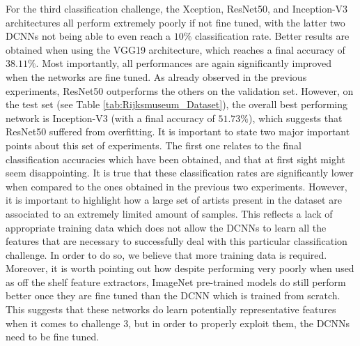 \documentclass[runningheads]{llncs}
\begin{document}
For the third classification challenge, the Xception, ResNet50, and Inception-V3 architectures all perform extremely poorly if not fine tuned, with the latter two DCNNs not being able to even reach a $10\%$ classification rate. Better results are obtained when using the VGG19 architecture, which reaches a final accuracy of $38.11\%$. Most importantly, all performances are again significantly improved when the networks are fine tuned. As already observed in the previous experiments, ResNet50 outperforms the others on the validation set. However, on the test set (see Table \ref{tab:Rijksmuseum_Dataset}), the overall best performing network is Inception-V3 (with a final accuracy of $51.73\%$), which suggests that ResNet50 suffered from overfitting. It is important to state two major important points about this set of experiments. The first one relates to the final classification accuracies which have been obtained, and that at first sight might seem disappointing. It is true that these classification rates are significantly lower when compared to the ones obtained in the previous two experiments. However, it is important to highlight how a large set of artists present in the dataset are associated to an extremely limited amount of samples. This reflects a lack of appropriate training data which does not allow the DCNNs to learn all the features that are necessary to successfully deal with this particular classification challenge. In order to do so, we believe that more training data is required. Moreover, it is worth pointing out how despite performing very poorly when used as off the shelf feature extractors, ImageNet pre-trained models do still perform better once they are fine tuned than the DCNN which is trained from scratch. This suggests that these networks do learn potentially representative features when it comes to challenge 3, but in order to properly exploit them, the DCNNs need to be fine tuned.
\end{document}
